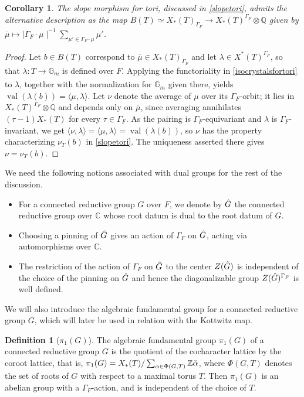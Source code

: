 \documentclass[11pt,a4paper]{article}
\theoremstyle{definition}
\newtheorem{D}[shared]{Definition}
\theoremstyle{plain}
\newtheorem{C}[shared]{Corollary}
\theoremstyle{remark}
\theoremstyle{plain}
\DeclareMathOperator{\val}{val}
\begin{document}
\begin{C}\label{galoisaverage}
    The slope morphism for tori, discussed in \ref{slopetori}, admits the alternative description as the map $B(T) \simeq X_*(T)_{\Gamma_F} \xrightarrow[]{} X_*(T)^{\Gamma_F}\otimes {\mathbb{Q}}$ given by $\overline{\mu} \mapsto \mid \Gamma_F \cdot \mu \mid ^{-1} \sum_{\mu' \in \Gamma_F \cdot \mu} \mu'$.
\end{C}
\begin{proof}
    Let $b \in B(T)$ correspond to $\overline{\mu} \in X_*(T)_{\Gamma_F}$ and let $\lambda \in X^*(T)^{\Gamma_F}$, so that $\lambda: T \xrightarrow[]{} \mathbb{G}_m$ is defined over $F$. Applying the functoriality in \ref{isocrystalsfortori} to $\lambda$, together with the normalization for $\mathbb{G}_m$ given there, yields $\val(\lambda(b)) = \langle \mu, \lambda \rangle$. Let $\nu$ denote the average of $\mu$ over its $\Gamma_F$-orbit; it lies in $X_*(T)^{\Gamma_F} \otimes \mathbb{Q}$ and depends only on $\overline{\mu}$, since averaging annihilates $(\tau - 1)X_*(T)$ for every $\tau \in \Gamma_F$. As the pairing is $\Gamma_F$-equivariant and $\lambda$ is $\Gamma_F$-invariant, we get $\langle \nu, \lambda \rangle = \langle \mu, \lambda \rangle = \val(\lambda(b))$, so $\nu$ has the property characterizing $\nu_T(b)$ in \ref{slopetori}. The uniqueness asserted there gives $\nu = \nu_T(b)$.
\end{proof}

We need the following notions associated with dual groups for the rest of the discussion.
\begin{itemize}
    \item For a connected reductive group $G$ over $F$, we denote by $\Hat{G}$ the connected reductive group over $\mathbb{C}$ whose root datum is dual to the root datum of $G$.
    \item Choosing a pinning of $\Hat{G}$ gives an action of $\Gamma_F$ on $\Hat{G}$, acting via automorphisms over $\mathbb{C}$.
    \item The restriction of the action of $\Gamma_F$ on $\Hat{G}$ to the center $Z(\Hat{G})$ is independent of the choice of the pinning on $\Hat{G}$ and hence the diagonalizable group $Z(\Hat{G})^{\Gamma_F}$ is well defined.
\end{itemize}

We will also introduce the algebraic fundamental group for a connected reductive group $G$, which will later be used in relation with the Kottwitz map.

\begin{D}[$\pi_1(G)$]
    The algebraic fundamental group $\pi_1(G)$ of a connected reductive group $G$ is the quotient of the cocharacter lattice by the coroot lattice, that is, $\pi_1(G) = X_*(T) / \sum_{\alpha \in \Phi(G,T)} \mathbb{Z} \Check{\alpha}$, where $\Phi(G,T)$ denotes the set of roots of $G$ with respect to a maximal torus $T$. Then $\pi_1(G)$ is an abelian group with a $\Gamma_F$-action, and is independent of the choice of $T$.
\end{D}
\end{document}
